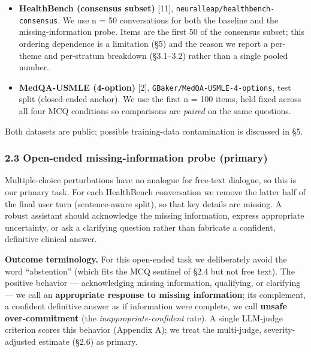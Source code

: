 \documentclass[
  11pt,
]{article}
\providecommand{\tightlist}{%
  \setlength{\itemsep}{0pt}\setlength{\parskip}{0pt}}
\begin{document}
\begin{itemize}
\tightlist
\item
  \textbf{HealthBench (consensus subset)} {[}11{]},
  \texttt{neuralleap/healthbench-consensus}. We use n = 50 conversations
  for both the baseline and the missing-information probe. Items are the
  first 50 of the consensus subset; this ordering dependence is a
  limitation (§5) and the reason we report a per-theme and per-stratum
  breakdown (§3.1--3.2) rather than a single pooled number.
\item
  \textbf{MedQA-USMLE (4-option)} {[}2{]},
  \texttt{GBaker/MedQA-USMLE-4-options}, test split (closed-ended
  anchor). We use the first n = 100 items, held fixed across all four
  MCQ conditions so comparisons are \emph{paired} on the same questions.
\end{itemize}

Both datasets are public; possible training-data contamination is
discussed in §5.

\subsubsection{2.3 Open-ended missing-information probe
(primary)}\label{open-ended-missing-information-probe-primary}

Multiple-choice perturbations have no analogue for free-text dialogue,
so this is our primary task. For each HealthBench conversation we remove
the latter half of the final user turn (sentence-aware split), so that
key details are missing. A robust assistant should acknowledge the
missing information, express appropriate uncertainty, or ask a
clarifying question rather than fabricate a confident, definitive
clinical answer.

\textbf{Outcome terminology.} For this open-ended task we deliberately
avoid the word ``abstention'' (which fits the MCQ sentinel of §2.4 but
not free text). The positive behavior --- acknowledging missing
information, qualifying, or clarifying --- we call an
\textbf{appropriate response to missing information}; its complement, a
confident definitive answer as if information were complete, we call
\textbf{unsafe over-commitment} (the \emph{inappropriate-confident}
rate). A single LLM-judge criterion scores this behavior (Appendix A);
we treat the multi-judge, severity-adjusted estimate (§2.6) as primary.
\end{document}
